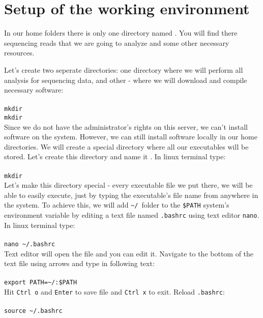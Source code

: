 \section{Setup of the working environment}
In our home folders there is only one directory named \texttt{\dataDir}.
You will find there \IonTorrent~ sequencing reads that we are going
to analyze and some other necessary resources.

Let's create two seperate directories:
one directory where we will perform all analysis for sequencing data, and other -
where we will download and compile necessary software:\\~\\
\texttt{mkdir \workDir} \\
\texttt{mkdir \progDir} \\

Since we do not have the administrator's rights on this server, we can't install
software on the system. However, we can still install software locally in our home
directories. We will create a special directory where all our executables will be stored.
Let's create this directory and name it \texttt{\binDir}. In linux terminal type:\\~\\
\texttt{mkdir \binDir}\\

Let's make this directory special - every executable file we put there, we will be able
to easily execute, just by typing the executable's file name from anywhere in the system.
To achieve this, we will add \texttt{\textasciitilde/\binDir}~folder to the \texttt{\$PATH} 
system's environment variable by editing a text file named \texttt{.bashrc} using text editor \texttt{nano}.
In linux terminal type:\\~\\
\texttt{nano \textasciitilde/.bashrc}\\

Text editor will open the file and you can edit it. Navigate to the bottom of the text file using arrows
and type in following text:\\~\\
\texttt{export PATH=\textasciitilde/\binDir:\$PATH}\\

Hit \texttt{Ctrl o} and \texttt{Enter} to save file and \texttt{Ctrl x} to exit.
Reload \texttt{.bashrc}:\\~\\%
\texttt{source \textasciitilde/.bashrc}\\

